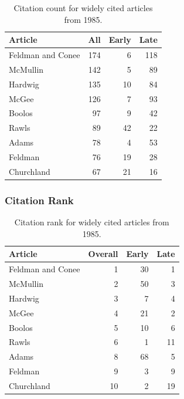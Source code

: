 \documentclass[
  10pt,
  letterpaper,
  DIV=11,
  numbers=noendperiod,
  twoside]{scrartcl}
\begin{document}
\begin{longtable}[]{@{}lrrr@{}}

\caption{\label{tbl-citation-count-1985}Citation count for widely cited
articles from 1985.}

\tabularnewline

\toprule\noalign{}
Article & All & Early & Late \\
\midrule\noalign{}
\endhead
\bottomrule\noalign{}
\endlastfoot
Feldman and Conee & 174 & 6 & 118 \\
McMullin & 142 & 5 & 89 \\
Hardwig & 135 & 10 & 84 \\
McGee & 126 & 7 & 93 \\
Boolos & 97 & 9 & 42 \\
Rawls & 89 & 42 & 22 \\
Adams & 78 & 4 & 53 \\
Feldman & 76 & 19 & 28 \\
Churchland & 67 & 21 & 16 \\

\end{longtable}

\subsubsection*{Citation Rank}\label{citation-rank-9}

\begin{longtable}[]{@{}lrrr@{}}

\caption{\label{tbl-citation-rank-1985}Citation rank for widely cited
articles from 1985.}

\tabularnewline

\toprule\noalign{}
Article & Overall & Early & Late \\
\midrule\noalign{}
\endhead
\bottomrule\noalign{}
\endlastfoot
Feldman and Conee & 1 & 30 & 1 \\
McMullin & 2 & 50 & 3 \\
Hardwig & 3 & 7 & 4 \\
McGee & 4 & 21 & 2 \\
Boolos & 5 & 10 & 6 \\
Rawls & 6 & 1 & 11 \\
Adams & 8 & 68 & 5 \\
Feldman & 9 & 3 & 9 \\
Churchland & 10 & 2 & 19 \\

\end{longtable}
\end{document}
